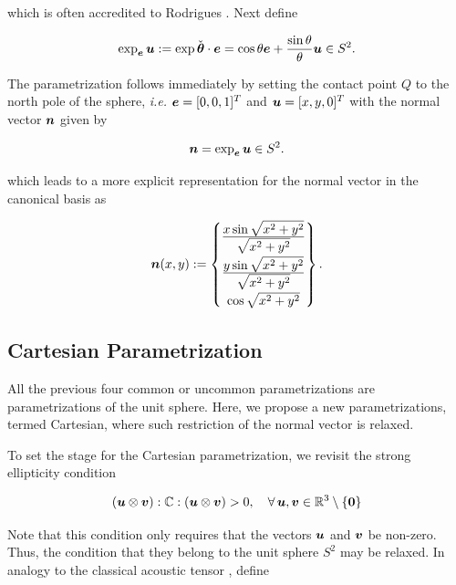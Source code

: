 \documentclass[12pt]{article}
\numberwithin{equation}{section}
\begin{document}
which is often accredited to Rodrigues
\citep{Gallier:2011}. Next define

\begin{equation}
  \exp_{{\boldsymbol{e}}} {\boldsymbol{u}}
  :=
  \exp \check{{\boldsymbol{\theta}}} \cdot {\boldsymbol{e}}
  =
  \cos \theta {\boldsymbol{e}} + \frac{\sin \theta}{\theta}
  {\boldsymbol{u}} \in S^2.
\end{equation}

The parametrization follows immediately by setting the contact point
$Q$ to the north pole of the sphere, \emph{i.e.} ${\boldsymbol{e}} = [0,0,1]^T$ and
${\boldsymbol{u}} = [x,y,0]^T$ with the normal vector ${\boldsymbol{n}}$ given by

\begin{equation}
  {\boldsymbol{n}}
  =
  \exp_{{\boldsymbol{e}}} {\boldsymbol{u}} \in S^2.
\end{equation}

which leads to a more explicit representation for the normal vector in
the canonical basis as

\begin{equation}
  {\boldsymbol{n}}(x,y)
  := 
  \begin{Bmatrix}
    \frac{\displaystyle x \sin \sqrt{x^2+y^2}}{\displaystyle \sqrt{x^2+y^2}}
    \\[0.9em]
    \frac{\displaystyle y \sin \sqrt{x^2+y^2}}{\displaystyle \sqrt{x^2+y^2}}
    \\[0.9em]
    \cos \sqrt{x^2+y^2}
  \end{Bmatrix}.
\end{equation}

\subsection{Cartesian Parametrization}
\label{subsec:Cartesian}

All the previous four common or uncommon parametrizations are 
parametrizations of the unit sphere. Here, we propose a new 
parametrizations, termed Cartesian, where such restriction of the 
normal vector is relaxed.

To set the stage for the Cartesian parametrization, we revisit the 
strong ellipticity condition

\begin{equation}
  ({\boldsymbol{u}} \otimes {\boldsymbol{v}}) : \mathbb{C} : ({\boldsymbol{u}} \otimes {\boldsymbol{v}}) > 0,
  \quad
  \forall \, {\boldsymbol{u}}, {\boldsymbol{v}} \in \mathbb{R}^3 \setminus \{\mathbf{0}\}
\end{equation}

Note that this condition only requires that the vectors ${\boldsymbol{u}}$ and ${\boldsymbol{v}}
$ be non-zero. Thus, the condition that they belong to the unit sphere 
$S^2$ may be relaxed. In analogy to the classical acoustic tensor 
, define
\end{document}
